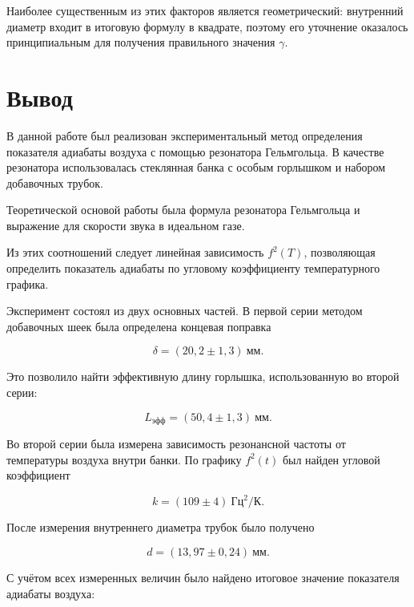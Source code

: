 \documentclass[12pt]{extreport}
\begin{document}
	Наиболее существенным из этих факторов является геометрический: внутренний диаметр входит в итоговую формулу в квадрате, поэтому его уточнение оказалось принципиальным для получения правильного значения \(\gamma\).
	
	
	
	\chapter{Вывод}
	
	\hspace{4mm} В данной работе был реализован экспериментальный метод определения показателя адиабаты воздуха с помощью резонатора Гельмгольца. В качестве резонатора использовалась стеклянная банка с особым горлышком и набором добавочных трубок.
	
	Теоретической основой работы была формула резонатора Гельмгольца и выражение для скорости звука в идеальном газе.
	
	Из этих соотношений следует линейная зависимость \(f^2(T)\), позволяющая определить показатель адиабаты по угловому коэффициенту температурного графика.
	
	Эксперимент состоял из двух основных частей. В первой серии методом добавочных шеек была определена концевая поправка
	
	\begin{equation*}
		\delta = (20,2 \pm 1,3)\ \text{мм}.
	\end{equation*}
	
	Это позволило найти эффективную длину горлышка, использованную во второй серии:
	
	\begin{equation*}
		L_{\text{эфф}} = (50,4 \pm 1,3)\ \text{мм}.
	\end{equation*}
	
	Во второй серии была измерена зависимость резонансной частоты от температуры воздуха внутри банки. По графику \(f^2(t)\) был найден угловой коэффициент
	
	\begin{equation*}
		k = (109 \pm 4)\ \text{Гц}^2/\text{К}.
	\end{equation*}
	
	После измерения внутреннего диаметра трубок было получено
	
	\begin{equation*}
		d = (13,97 \pm 0,24)\ \text{мм}.
	\end{equation*}
	
	С учётом всех измеренных величин было найдено итоговое значение показателя адиабаты воздуха:
	
\end{document}
